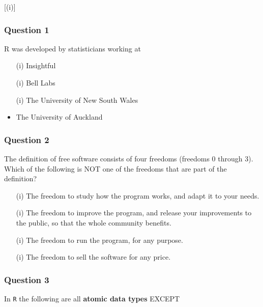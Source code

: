 [(i)]
\begin{frame}
\frametitle{Question 1}
\Large
R was developed by statisticians working at
\begin{itemize}
\item[(i)] Insightful
\item[(i)] Bell Labs
\item[(i)] The University of New South Wales
\item The University of Auckland
\end{itemize}
\end{frame}
\begin{frame}
\frametitle{Question 2}
\Large
The definition of free software consists of four freedoms (freedoms 0 through 3). \\ Which of the following is NOT one of the freedoms that are part of the definition?
\begin{itemize}
\item[(i)] The freedom to study how the program works, and adapt it to your needs.
\item[(i)] The freedom to improve the program, and release your improvements to the public, so that the whole community benefits.
\item[(i)] The freedom to run the program, for any purpose.
\item[(i)] The freedom to sell the software for any price.
\end{itemize}
\end{frame}
\begin{frame}
\frametitle{Question 3}
\Large
In \texttt{R} the following are all \textbf{atomic data types} EXCEPT
\end{frame}
